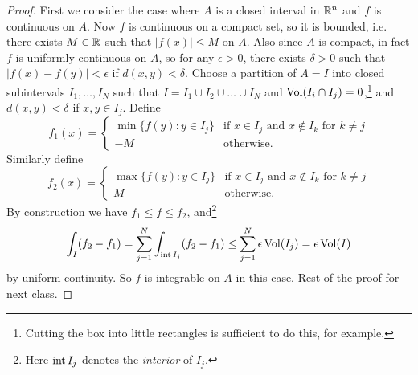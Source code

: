 \begin{proof}
  First we consider the case where $A$ is a closed
  interval in $\mathbb{R}^n$ and $f$ is continuous on $A$.
  Now $f$ is continuous on a compact set, so it is
  bounded, i.e. there exists $M \in \mathbb{R}$ such that
  $|f(x)| \le M$ on $A$. Also since $A$ is compact,
  in fact $f$ is uniformly continuous on $A$, so
  for any $\epsilon > 0$, there exists $\delta > 0$
  such that $|f(x) - f(y)| < \epsilon$ if
  $d(x, y) < \delta$. Choose a partition of $A = I$
  into closed subintervals $I_1, \dots, I_N$ such that
  $I = I_1 \cup I_2 \cup \dots \cup I_N$ and
  $\operatorname{Vol}(I_i \cap I_j) = 0$,\footnote{Cutting the box into little rectangles is sufficient to do this, for example.} and $d(x, y) < \delta$
  if $x, y \in I_j$. Define
  \[
    f_1(x) =
    \begin{cases}
      \min\{f(y) : y \in I_j\} & \text{if } x \in I_j \text{ and } x \notin I_k \text{ for } k \ne j \\
      -M & \text{otherwise}.
    \end{cases}
  \]
  Similarly define
  \[
    f_2(x) =
    \begin{cases}
      \max\{f(y) : y \in I_j\} & \text{if } x \in I_j \text{ and } x \notin I_k \text{ for } k \ne j \\
      M & \text{otherwise}.
    \end{cases}
  \]
  By construction we have $f_1 \le f \le f_2$, and\footnote{Here $\operatorname{int} I_j$ denotes the \emph{interior} of $I_j$.}
  \[
    \int_I (f_2 - f_1)
    = \sum_{j = 1}^N \int_{\operatorname{int} I_j} (f_2 - f_1)
    \le \sum_{j = 1}^N \epsilon \operatorname{Vol}(I_j)
    = \epsilon \operatorname{Vol}(I)
  \]
  by uniform continuity.
  So $f$ is integrable on $A$ in
  this case.
  Rest of the proof for next class.
\end{proof}
